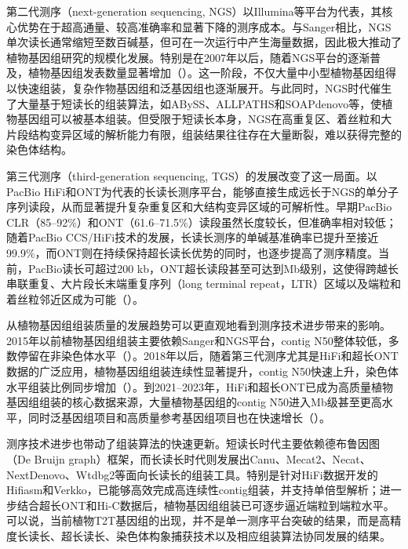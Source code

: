 第二代测序（next-generation sequencing, NGS）以Illumina等平台为代表，其核心优势在于超高通量、较高准确率和显著下降的测序成本\cite{shendure2008next}。与Sanger相比，NGS单次读长通常缩短至数百碱基，但可在一次运行中产生海量数据\cite{shendure2008next}，因此极大推动了植物基因组研究的规模化发展。特别是在2007年以后，随着NGS平台的逐渐普及，植物基因组发表数量显著增加（）。这一阶段，不仅大量中小型植物基因组得以快速组装，复杂作物基因组和泛基因组也逐渐展开。与此同时，NGS时代催生了大量基于短读长的组装算法，如ABySS\cite{simpson2009abyss}、ALLPATHS\cite{butler2008allpaths}和SOAPdenovo\cite{xie2014soapdenovo}等，使植物基因组可以被基本组装。但受限于短读长本身，NGS在高重复区、着丝粒和大片段结构变异区域的解析能力有限，组装结果往往存在大量断裂，难以获得完整的染色体结构。

第三代测序（third-generation sequencing, TGS）的发展改变了这一局面。以PacBio HiFi和ONT为代表的长读长测序平台，能够直接生成远长于NGS的单分子序列读段，从而显著提升复杂重复区和大结构变异区域的可解析性\cite{weirather2017comprehensive, lang2020comparison}。早期PacBio CLR（85–92\%）和ONT（61.6–71.5\%）读段虽然长度较长，但准确率相对较低\cite{warburton2023long, laver2015assessing}；随着PacBio CCS/HiFi技术的发展，长读长测序的单碱基准确率已提升至接近99.9\%\cite{weirather2017comprehensive}，而ONT则在持续保持超长读长优势的同时，也逐步提高了测序精度\cite{van2023genomics}。当前，PacBio读长可超过200 kb，ONT超长读段甚至可达到Mb级别\cite{van2023genomics}，这使得跨越长串联重复、大片段长末端重复序列（long terminal repeat，LTR）区域以及端粒和着丝粒邻近区成为可能（）。

从植物基因组组装质量的发展趋势可以更直观地看到测序技术进步带来的影响。2015年以前植物基因组组装主要依赖Sanger和NGS平台，contig N50整体较低，多数停留在非染色体水平（）。2018年以后，随着第三代测序尤其是HiFi和超长ONT数据的广泛应用，植物基因组组装连续性显著提升，contig N50快速上升，染色体水平组装比例同步增加（）。到2021--2023年，HiFi和超长ONT已成为高质量植物基因组组装的核心数据来源，大量植物基因组的contig N50进入Mb级甚至更高水平，同时泛基因组项目和高质量参考基因组项目也在快速增长（）。

测序技术进步也带动了组装算法的快速更新。短读长时代主要依赖德布鲁因图（De Bruijn graph）框架，而长读长时代则发展出Canu\cite{koren2017canu}、Mecat2\cite{xiao2017mecat}、Necat\cite{chen2021efficient}、NextDenovo\cite{hu2024nextdenovo}、Wtdbg2\cite{ruan2020fast}等面向长读长的组装工具。特别是针对HiFi数据开发的Hifiasm\cite{cheng2021haplotype}和Verkko\cite{rautiainen2023telomere}，已能够高效完成高连续性contig组装，并支持单倍型解析；进一步结合超长ONT和Hi-C数据后，植物基因组组装已可逐步逼近端粒到端粒水平。可以说，当前植物T2T基因组的出现，并不是单一测序平台突破的结果，而是高精度长读长、超长读长、染色体构象捕获技术以及相应组装算法协同发展的结果。

